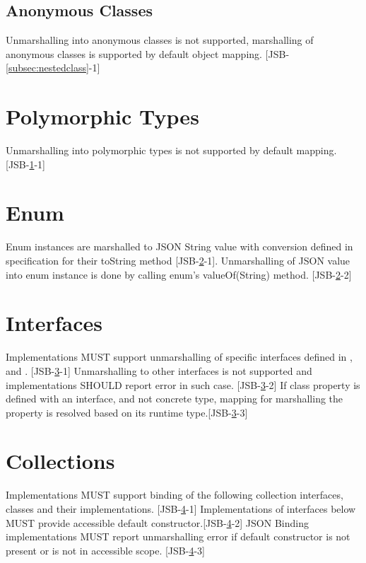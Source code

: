 \subsection{Anonymous Classes}
\label{subsec:anonymous}
Unmarshalling into anonymous classes is not supported, marshalling of anonymous classes is supported by default object mapping. [JSB-\ref{subsec:nestedclass}-1]

\section{Polymorphic Types}
\label{sec:polymorph}
Unmarshalling into polymorphic types is not supported by default mapping. [JSB-\ref{sec:polymorph}-1]

\section{Enum}
\label{sec:enum}
Enum instances are marshalled to JSON String value with conversion defined in specification for their toString method [JSB-\ref{sec:enum}-1]. Unmarshalling of JSON value into enum instance is done by calling enum's valueOf(String) method. [JSB-\ref{sec:enum}-2]

\section{Interfaces}
\label{sec:interfaces}
Implementations MUST support unmarshalling of specific interfaces defined in  , and . [JSB-\ref{sec:interfaces}-1] Unmarshalling to other interfaces is not supported and implementations SHOULD report error in such case. [JSB-\ref{sec:interfaces}-2] If class property is defined with an interface, and not concrete type, mapping for marshalling the property is resolved based on its runtime type.[JSB-\ref{sec:interfaces}-3]

\section{Collections}
\label{sec:collections}
Implementations MUST support binding of the following collection interfaces, classes and their implementations. [JSB-\ref{sec:collections}-1] Implementations of interfaces below MUST provide accessible default constructor.[JSB-\ref{sec:collections}-2] JSON Binding implementations MUST report unmarshalling error if default constructor is not present or is not in accessible scope. [JSB-\ref{sec:collections}-3]

